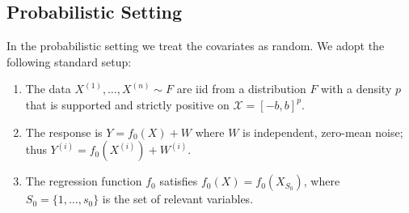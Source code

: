\subsection{Probabilistic Setting}

In the probabilistic setting we treat the covariates as random.  We
adopt the following standard setup:

\begin{enumerate}
\item The data $X^{(1)},\ldots, X^{(n)} \sim F$ are iid from
a distribution $F$ with a density $p$ that is supported and strictly positive on $\mathcal{X}=[-b,b]^p$. 
\item The response is $Y = f_0(X) + W$ where $W$ is
  independent, zero-mean noise; thus $Y^{(i)} = f_0(X^{(i)}) + W^{(i)}$.
\item The regression function $f_0$ satisfies
$f_0(X) = f_0(X_{S_0})$, where $S_0 = \{1,\ldots,s_0\}$ is the set of
relevant variables.
\end{enumerate}


